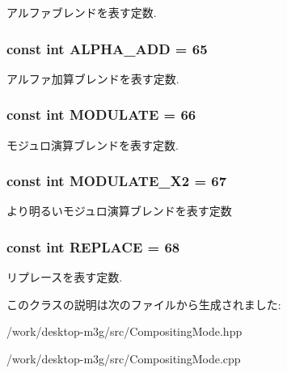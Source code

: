 アルファブレンドを表す定数. \hypertarget{classm3g_1_1CompositingMode_91ac80a5450e5f7f7e382860829030d9}{
\subsubsection[{ALPHA\_\-ADD}]{\setlength{\rightskip}{0pt plus 5cm}const int {\bf ALPHA\_\-ADD} = 65}}
\label{classm3g_1_1CompositingMode_91ac80a5450e5f7f7e382860829030d9}


アルファ加算ブレンドを表す定数. \hypertarget{classm3g_1_1CompositingMode_96b64c2847348fb73a90c4a501cda9d1}{
\subsubsection[{MODULATE}]{\setlength{\rightskip}{0pt plus 5cm}const int {\bf MODULATE} = 66}}
\label{classm3g_1_1CompositingMode_96b64c2847348fb73a90c4a501cda9d1}


モジュロ演算ブレンドを表す定数. \hypertarget{classm3g_1_1CompositingMode_cb426684e42a5ae425989c65fbb7dbc4}{
\subsubsection[{MODULATE\_\-X2}]{\setlength{\rightskip}{0pt plus 5cm}const int {\bf MODULATE\_\-X2} = 67}}
\label{classm3g_1_1CompositingMode_cb426684e42a5ae425989c65fbb7dbc4}


より明るいモジュロ演算ブレンドを表す定数 \hypertarget{classm3g_1_1CompositingMode_47a00ac5a59817a48db06fb2a538883c}{
\subsubsection[{REPLACE}]{\setlength{\rightskip}{0pt plus 5cm}const int {\bf REPLACE} = 68}}
\label{classm3g_1_1CompositingMode_47a00ac5a59817a48db06fb2a538883c}


リプレースを表す定数. 

このクラスの説明は次のファイルから生成されました:\begin{CompactItemize}
\item 
/work/desktop-m3g/src/CompositingMode.hpp\item 
/work/desktop-m3g/src/CompositingMode.cpp\end{CompactItemize}

